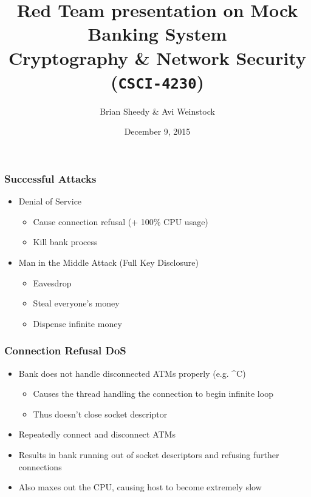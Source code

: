 \documentclass{beamer}
\title{Red Team presentation on Mock Banking System\\Cryptography \& Network Security (\Verb|CSCI-4230|)}
\date{December 9, 2015}
\author{Brian Sheedy \& Avi Weinstock}
\begin{document}
\maketitle

\begin{frame}[fragile]
\frametitle{Successful Attacks}
\begin{itemize}
\item Denial of Service
\begin{itemize}
\item Cause connection refusal (+ 100\% CPU usage)
\item Kill bank process
\end{itemize}
\item Man in the Middle Attack (Full Key Disclosure)
\begin{itemize}
\item Eavesdrop
\item Steal everyone's money
\item Dispense infinite money
\end{itemize}
\end{itemize}
\end{frame}

\begin{frame}[fragile]
\frametitle{Connection Refusal DoS}
\begin{itemize}
\item Bank does not handle disconnected ATMs properly (e.g. \^{}C)
\begin{itemize}
\item Causes the thread handling the connection to begin infinite loop
\item Thus doesn't close socket descriptor
\end{itemize}
\item Repeatedly connect and disconnect ATMs
\item Results in bank running out of socket descriptors and refusing further connections
\item Also maxes out the CPU, causing host to become extremely slow
\end{itemize}
\end{frame}
\end{document}
